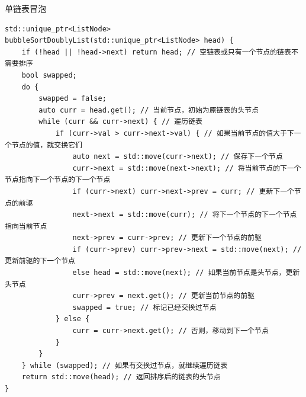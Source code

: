 \begin{example}{单链表冒泡}{}
\begin{verbatim}
std::unique_ptr<ListNode> bubbleSortDoublyList(std::unique_ptr<ListNode> head) {
    if (!head || !head->next) return head; // 空链表或只有一个节点的链表不需要排序
    bool swapped;
    do {
        swapped = false;
        auto curr = head.get(); // 当前节点，初始为原链表的头节点
        while (curr && curr->next) { // 遍历链表
            if (curr->val > curr->next->val) { // 如果当前节点的值大于下一个节点的值，就交换它们
                auto next = std::move(curr->next); // 保存下一个节点
                curr->next = std::move(next->next); // 将当前节点的下一个节点指向下一个节点的下一个节点
                if (curr->next) curr->next->prev = curr; // 更新下一个节点的前驱
                next->next = std::move(curr); // 将下一个节点的下一个节点指向当前节点
                next->prev = curr->prev; // 更新下一个节点的前驱
                if (curr->prev) curr->prev->next = std::move(next); // 更新前驱的下一个节点
                else head = std::move(next); // 如果当前节点是头节点，更新头节点
                curr->prev = next.get(); // 更新当前节点的前驱
                swapped = true; // 标记已经交换过节点
            } else {
                curr = curr->next.get(); // 否则，移动到下一个节点
            }
        }
    } while (swapped); // 如果有交换过节点，就继续遍历链表
    return std::move(head); // 返回排序后的链表的头节点
}
    \end{verbatim}
\end{example}

